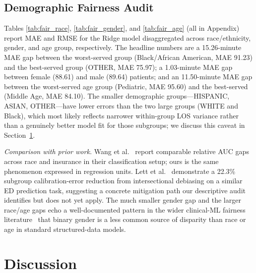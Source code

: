 \documentclass[conference]{IEEEtran}
\begin{document}
\subsection{Demographic Fairness Audit}
Tables \ref{tab:fair_race}, \ref{tab:fair_gender}, and \ref{tab:fair_age}
(all in Appendix) report MAE and RMSE for the Ridge model disaggregated
across race/ethnicity, gender, and age group, respectively. The headline
numbers are a 15.26-minute MAE gap between the worst-served group
(Black/African American, MAE 91.23) and the best-served group (OTHER, MAE
75.97); a 1.03-minute MAE gap between female (88.61) and male (89.64)
patients; and an 11.50-minute MAE gap between the worst-served age group
(Pediatric, MAE 95.60) and the best-served (Middle Age, MAE 84.10). The
smaller demographic groups---HISPANIC, ASIAN, OTHER---have lower errors than
the two large groups (WHITE and Black), which most likely reflects
narrower within-group LOS variance rather than a genuinely better model fit
for those subgroups; we discuss this caveat in Section~\ref{sec:discussion}.

\textit{Comparison with prior work.} Wang et al.~\cite{wang2025fair}
report comparable relative AUC gaps across race and insurance in their
classification setup; ours is the same phenomenon expressed in regression
units. Lett et al.~\cite{lett2025} demonstrate a 22.3\% subgroup
calibration-error reduction from intersectional debiasing on a similar ED
prediction task, suggesting a concrete mitigation path our descriptive
audit identifies but does not yet apply. The much smaller gender gap and
the larger race/age gaps echo a well-documented pattern in the wider
clinical-ML fairness literature~\cite{rajkomar2018, obermeyer2019} that
binary gender is a less common source of disparity than race or age in
standard structured-data models.

\section{Discussion}\label{sec:discussion}
\end{document}
